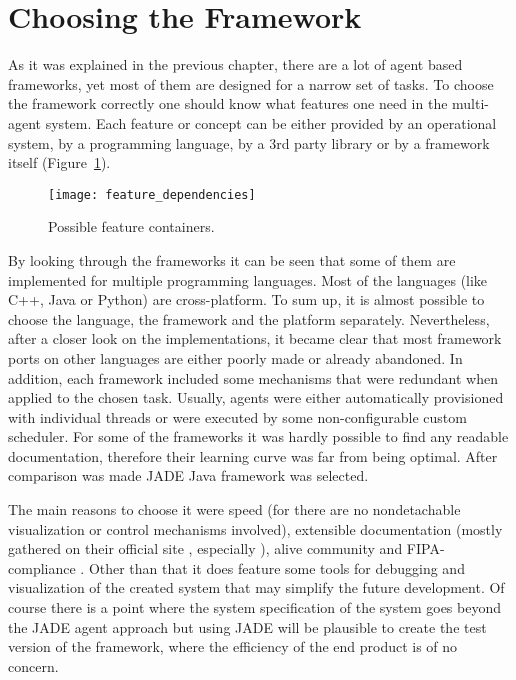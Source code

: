 \section{Choosing the Framework}
As it was explained in the previous chapter, there are a lot of agent based frameworks, yet most of them are designed for a narrow set of tasks. To choose the framework correctly one should know what features one need in the multi-agent system. Each feature or concept can be either provided by an operational system, by a programming language, by a 3rd party library or by a framework itself (Figure~\ref{Feature}).
 \begin{figure}[h!]
    \begin{center}
      \texttt{[image: feature\_dependencies]}
      \caption{Possible feature containers.}
      \label{Feature}
     \end{center}
    \end{figure}

By looking through the frameworks it can be seen that some of them are implemented for multiple programming languages. Most of the languages (like C++, Java or Python) are cross-platform.
To sum up, it is almost possible to choose the language, the framework and the platform separately.
Nevertheless, after a closer look on the implementations, it became clear that most framework ports on other languages are either poorly made or already abandoned.
In addition, each framework included some mechanisms that were redundant when applied to the chosen task. Usually, agents were either automatically provisioned with individual threads or were executed by some non-configurable custom scheduler. For some of the frameworks it was hardly possible to find any readable documentation, therefore their learning curve was far from being optimal.  After comparison was made JADE Java framework was selected.

 The main reasons to choose it were speed \cite{JAVAap} (for there are no nondetachable visualization or control mechanisms involved), extensible documentation (mostly gathered on their official site \cite{jadeDoc}, especially \cite{jadeBook}), alive community and FIPA-compliance \cite{ap3}. Other than that it does feature some tools for debugging and visualization of the created system that may simplify the future development. Of course there is a point where the system specification of the system goes beyond the JADE agent approach but using JADE will be plausible to create the test version of the framework, where the efficiency of the end product is of no concern.

